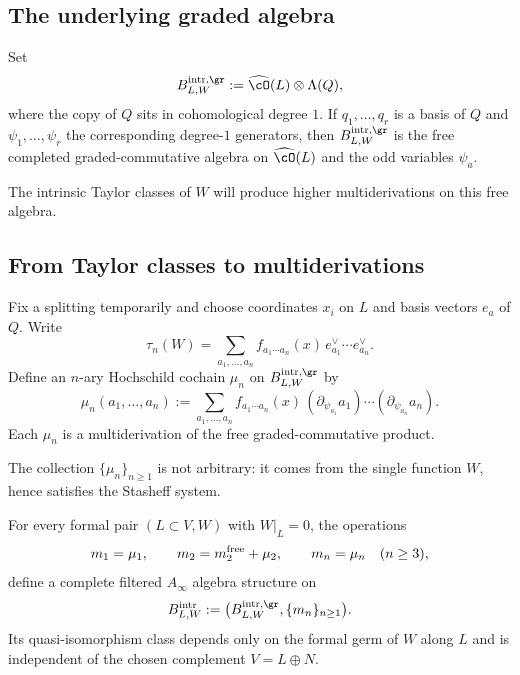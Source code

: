 \subsection{The underlying graded algebra}

Set
\[
B^{\intr,\gr}_{L,W}:=\widehat{\cO}(L)\ot \Lambda(Q),
\]
where the copy of $Q$ sits in cohomological degree $1$. If $q_1,\dots,q_r$ is a basis of $Q$ and $\psi_1,\dots,\psi_r$ the corresponding degree-$1$ generators, then $B^{\intr,\gr}_{L,W}$ is the free completed graded-commutative algebra on $\widehat{\cO}(L)$ and the odd variables $\psi_a$.

The intrinsic Taylor classes of $W$ will produce higher multiderivations on this free algebra.

\subsection{From Taylor classes to multiderivations}

Fix a splitting temporarily and choose coordinates $x_i$ on $L$ and basis vectors $e_a$ of $Q$. Write
\[
\tau_n(W)=\sum_{a_1,\dots,a_n} f_{a_1\cdots a_n}(x)\, e_{a_1}^\vee\cdots e_{a_n}^\vee.
\]
Define an $n$-ary Hochschild cochain $\mu_n$ on $B^{\intr,\gr}_{L,W}$ by
\begin{equation}\label{eq:intrinsic-mu}
\mu_n(a_1,\dots,a_n)
:=
\sum_{a_1,\dots,a_n}
f_{a_1\cdots a_n}(x)\,
(\partial_{\psi_{a_1}}a_1)\cdots(\partial_{\psi_{a_n}}a_n).
\end{equation}
Each $\mu_n$ is a multiderivation of the free graded-commutative product.

The collection $\{\mu_n\}_{n\ge 1}$ is not arbitrary: it comes from the single function $W$, hence satisfies the Stasheff system.

\begin{theorem}\label{thm:intrinsic-boundary}
For every formal pair $(L\subset V,W)$ with $W|_L=0$, the operations
\[
m_1=\mu_1,\qquad
m_2=m_2^{\mathrm{free}}+\mu_2,\qquad
m_n=\mu_n\quad (n\ge 3),
\]
define a complete filtered $A_\infty$ algebra structure on
\[
B^\intr_{L,W}:= \bigl(B^{\intr,\gr}_{L,W},\{m_n\}_{n\ge 1}\bigr).
\]
Its quasi-isomorphism class depends only on the formal germ of $W$ along $L$ and is independent of the chosen complement $V=L\oplus N$.
\end{theorem}

